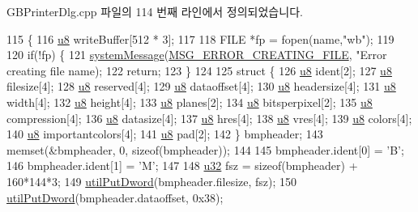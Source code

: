 G\+B\+Printer\+Dlg.\+cpp 파일의 114 번째 라인에서 정의되었습니다.


\begin{DoxyCode}
115 \{
116   \mbox{\hyperlink{_system_8h_aed742c436da53c1080638ce6ef7d13de}{u8}} writeBuffer[512 * 3];
117   
118   FILE *fp = fopen(name,\textcolor{stringliteral}{"wb"});
119 
120   \textcolor{keywordflow}{if}(!fp) \{
121     \mbox{\hyperlink{system_8cpp_a747a9cb8e015a3d45cca636b5bd0fc69}{systemMessage}}(\mbox{\hyperlink{_n_l_s_8h_a165f1f2539e202f0a24e6e9583c63475}{MSG\_ERROR\_CREATING\_FILE}}, \textcolor{stringliteral}{"Error creating file %
      name);
122     \textcolor{keywordflow}{return};
123   \}
124 
125   \textcolor{keyword}{struct }\{
126     \mbox{\hyperlink{_system_8h_aed742c436da53c1080638ce6ef7d13de}{u8}} ident[2];
127     \mbox{\hyperlink{_system_8h_aed742c436da53c1080638ce6ef7d13de}{u8}} filesize[4];
128     \mbox{\hyperlink{_system_8h_aed742c436da53c1080638ce6ef7d13de}{u8}} reserved[4];
129     \mbox{\hyperlink{_system_8h_aed742c436da53c1080638ce6ef7d13de}{u8}} dataoffset[4];
130     \mbox{\hyperlink{_system_8h_aed742c436da53c1080638ce6ef7d13de}{u8}} headersize[4];
131     \mbox{\hyperlink{_system_8h_aed742c436da53c1080638ce6ef7d13de}{u8}} width[4];
132     \mbox{\hyperlink{_system_8h_aed742c436da53c1080638ce6ef7d13de}{u8}} height[4];
133     \mbox{\hyperlink{_system_8h_aed742c436da53c1080638ce6ef7d13de}{u8}} planes[2];
134     \mbox{\hyperlink{_system_8h_aed742c436da53c1080638ce6ef7d13de}{u8}} bitsperpixel[2];
135     \mbox{\hyperlink{_system_8h_aed742c436da53c1080638ce6ef7d13de}{u8}} compression[4];
136     \mbox{\hyperlink{_system_8h_aed742c436da53c1080638ce6ef7d13de}{u8}} datasize[4];
137     \mbox{\hyperlink{_system_8h_aed742c436da53c1080638ce6ef7d13de}{u8}} hres[4];
138     \mbox{\hyperlink{_system_8h_aed742c436da53c1080638ce6ef7d13de}{u8}} vres[4];
139     \mbox{\hyperlink{_system_8h_aed742c436da53c1080638ce6ef7d13de}{u8}} colors[4];
140     \mbox{\hyperlink{_system_8h_aed742c436da53c1080638ce6ef7d13de}{u8}} importantcolors[4];
141     \mbox{\hyperlink{_system_8h_aed742c436da53c1080638ce6ef7d13de}{u8}} pad[2];
142   \} bmpheader;
143   memset(&bmpheader, 0, \textcolor{keyword}{sizeof}(bmpheader));
144 
145   bmpheader.ident[0] = \textcolor{charliteral}{'B'};
146   bmpheader.ident[1] = \textcolor{charliteral}{'M'};
147 
148   \mbox{\hyperlink{_system_8h_a10e94b422ef0c20dcdec20d31a1f5049}{u32}} fsz = \textcolor{keyword}{sizeof}(bmpheader) + 160*144*3;
149   \mbox{\hyperlink{_util_8cpp_a61ef2cbdb9d8b5c50004ebd1557439c7}{utilPutDword}}(bmpheader.filesize, fsz);
150   \mbox{\hyperlink{_util_8cpp_a61ef2cbdb9d8b5c50004ebd1557439c7}{utilPutDword}}(bmpheader.dataoffset, 0x38);
}
\end{DoxyCode}
